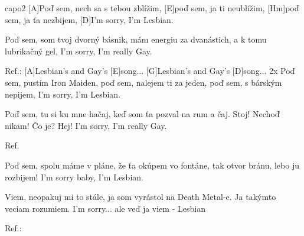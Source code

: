 \hfill capo2
[A]Poď sem, nech sa s tebou zblížim,
[E]poď sem, ja ti neublížim,
[Hm]poď sem, ja ťa nezbijem,
[D]I'm sorry, I'm Lesbian.

Poď sem, som tvoj dvorný básnik,
mám energiu za dvanástich,
a k tomu lubrikačný gel,
I'm sorry, I'm really Gay.

Ref.:
[A]Lesbian's and Gay's [E]song... 
[G]Lesbian's and Gay's [D]song... 2x
\slpc
Poď sem, pustím Iron Maiden,
poď sem, nalejem ti za jeden,
poď sem, s bárským nepijem,
I'm sorry, I'm Lesbian.

Poď sem, tu si ku mne hačaj,
keď som ťa pozval na rum a čaj.
Stoj! Nechoď nikam! Čo je? Hej!
I'm sorry, I'm really Gay.

Ref.

Poď sem, spolu máme v pláne,
že ťa okúpem vo fontáne,
tak otvor bránu, lebo ju rozbijem!
I'm sorry baby, I'm Lesbian.

Viem, neopakuj mi to stále,
ja som vyrástol na Death Metal-e.
Ja takýmto veciam rozumiem.
I'm sorry... ale veď ja viem - Lesbian

Ref.:
